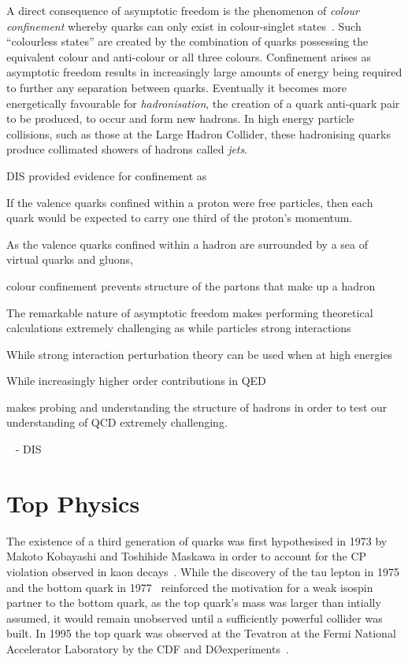 A direct consequence of asymptotic freedom is the phenomenon of \emph{colour confinement} whereby quarks can only exist in colour-singlet states~\cite{ElectroweakStrong,Griffiths,devenish2004deep}.
Such ``colourless states'' are created by the combination of quarks possessing the equivalent colour and anti-colour or all three colours.
Confinement arises as asymptotic freedom results in increasingly large amounts of energy being required to further any separation between quarks.
Eventually it becomes more energetically favourable for \emph{hadronisation}, the creation of a quark anti-quark pair to be produced, to occur and form new hadrons.
In high energy particle collisions, such as those at the Large Hadron Collider, these hadronising quarks produce collimated showers of hadrons called \emph{jets}.

DIS provided evidence for confinement as 

If the valence quarks confined within a proton were free particles, then each quark would be expected to carry one third of the proton's momentum.

As the valence quarks confined within a hadron are surrounded by a sea of virtual quarks and gluons, 

colour confinement prevents  structure of the partons that make up a hadron 

The remarkable nature of asymptotic freedom makes performing theoretical calculations extremely challenging as while particles  strong interactions 

While strong interaction perturbation theory can be used when at high energies 

While increasingly higher order contributions in QED

 makes probing and understanding the structure of hadrons in order to test our understanding of QCD extremely challenging.


~\cite{evenish2004deep} - DIS


\section{Top Physics}\label{sec:top-physics}
The existence of a third generation of quarks was first hypothesised in 1973 by Makoto Kobayashi and Toshihide Maskawa in order to account for the CP violation observed in kaon decays~\cite{Kobayashi:1973fv}.
While the discovery of the tau lepton in 1975 and the bottom quark in 1977~\cite{Herb:1977ek} reinforced the motivation for a weak isospin partner to the bottom quark, as the top quark's mass was larger than intially assumed, it would remain unobserved until a sufficiently powerful collider was built.
In 1995 the top quark was observed at the Tevatron at the Fermi National Accelerator Laboratory by the CDF and D\O experiments~\cite{Abe:1995hr,D0:1995jca}.


